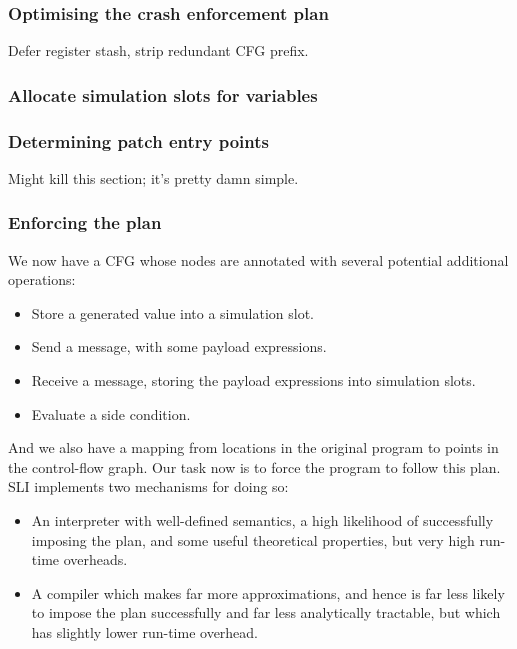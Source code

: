 \subsubsection{Optimising the crash enforcement plan}
Defer register stash, strip redundant CFG prefix.

\subsubsection{Allocate simulation slots for variables}

\subsubsection{Determining patch entry points}
Might kill this section; it's pretty damn simple.

\subsubsection{Enforcing the plan}


We now have a CFG whose nodes are annotated with several potential additional operations:

\begin{itemize}
\item Store a generated value into a simulation slot.
\item Send a message, with some payload expressions.
\item Receive a message, storing the payload expressions into simulation slots.
\item Evaluate a side condition.
\end{itemize}

And we also have a mapping from locations in the original program to points in the control-flow graph.
Our task now is to force the program to follow this plan.
SLI implements two mechanisms for doing so:

\begin{itemize}
\item
  An interpreter with well-defined semantics, a high likelihood of successfully imposing the plan, and some useful theoretical properties, but very high run-time overheads.
\item
  A compiler which makes far more approximations, and hence is far less likely to impose the plan successfully and far less analytically tractable, but which has slightly lower run-time overhead.
\end{itemize}


